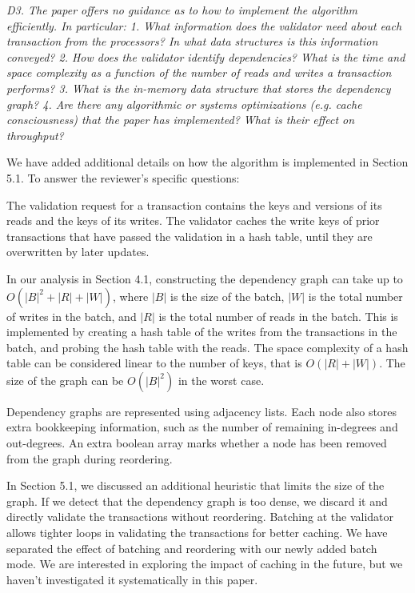 \documentclass{article}
\begin{document}
\emph{D3. The paper offers no guidance as to how to implement the algorithm efficiently. In particular:
	1. What information does the validator need about each transaction from the processors? In what data structures is this information conveyed?
	2. How does the validator identify dependencies? What is the time and space complexity as a function of the number of reads and writes a transaction performs?
	3. What is the in-memory data structure that stores the dependency graph? 
	4. Are there any algorithmic or systems optimizations (e.g. cache consciousness) that the paper has implemented? What is their effect on throughput?}

We have added additional details on how the algorithm is implemented in Section 5.1. To answer the reviewer's specific questions:

The validation request for a transaction contains the keys and versions of its reads and the keys of its writes. The validator caches the write keys of prior transactions that have passed the validation in a hash table, until they are overwritten by later updates. 

In our analysis in Section 4.1, constructing the dependency graph can take up to $O(|B|^2+|R|+|W|)$, where $|B|$ is the size of the batch, $|W|$ is the total number of writes in the batch, and $|R|$ is the total number of reads in the batch. This is implemented by creating a hash table of the writes from the transactions in the batch, and probing the hash table with the reads. The space complexity of a hash table can be considered linear to the number of keys, that is $O(|R|+|W|)$. The size of the graph can be $O(|B|^2)$ in the worst case.

Dependency graphs are represented using adjacency lists. Each node also stores extra bookkeeping information, such as the number of remaining in-degrees and out-degrees. An extra boolean array marks whether a node has been removed from the graph during reordering.

In Section 5.1, we discussed an additional heuristic that limits the size of the graph. If we detect that the dependency graph is too dense, we discard it and directly validate the transactions without reordering. Batching at the validator allows tighter loops in validating the transactions for better caching. We have separated the effect of batching and reordering with our newly added batch mode. We are interested in exploring the impact of caching in the future, but we haven't investigated it systematically in this paper.
\end{document}
